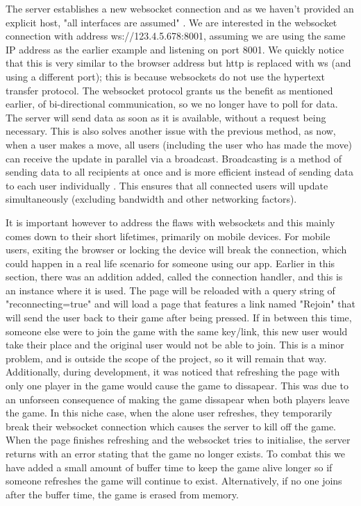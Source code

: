 The server establishes a new websocket connection and as we haven't provided an explicit host, "all interfaces are assumed" \cite{NoHost}. We are interested in the websocket connection with address ws://123.4.5.678:8001, assuming we are using the same IP address as the earlier example and listening on port 8001. We quickly notice that this is very similar to the browser address but http is replaced with ws (and using a different port); this is because websockets do not use the hypertext transfer protocol. The websocket protocol grants us the benefit as mentioned earlier, of bi-directional communication, so we no longer have to poll for data. The server will send data as soon as it is available, without a request being necessary. This is also solves another issue with the previous method, as now, when a user makes a move, all users (including the user who has made the move) can receive the update in parallel via a broadcast. Broadcasting is a method of sending data to all recipients at once and is more efficient instead of sending data to each user individually \cite{Broadcast}. This ensures that all connected users will update simultaneously (excluding bandwidth and other networking factors).

It is important however to address the flaws with websockets and this mainly comes down to their short lifetimes, primarily on mobile devices. For mobile users, exiting the browser or locking the device will break the connection, which could happen in a real life scenario for someone using our app. Earlier in this section, there was an addition added, called the connection handler, and this is an instance where it is used. The page will be reloaded with a query string of "reconnecting=true" and will load a page that features a link named "Rejoin" that will send the user back to their game after being pressed. If in between this time, someone else were to join the game with the same key/link, this new user would take their place and the original user would not be able to join. This is a minor problem, and is outside the scope of the project, so it will remain that way. Additionally, during development, it was noticed that refreshing the page with only one player in the game would cause the game to dissapear. This was due to an unforseen consequence of making the game dissapear when both players leave the game. In this niche case, when the alone user refreshes, they temporarily break their websocket connection which causes the server to kill off the game. When the page finishes refreshing and the websocket tries to initialise, the server returns with an error stating that the game no longer exists. To combat this we have added a small amount of buffer time to keep the game alive longer so if someone refreshes the game will continue to exist. Alternatively, if no one joins after the buffer time, the game is erased from memory.


